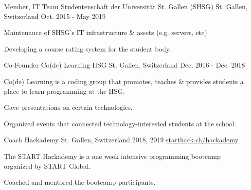 

\begin{cventries}

  \cventry
    {Member, IT Team} %
    {Studentenschaft der Universität St. Gallen (SHSG)} %
    {St. Gallen, Switzerland} %
    {Oct. 2015 - May 2019} %
    {} %
    {
      \begin{cvitems} %
        \item {Maintenance of SHSG's IT infrastructure \& assets (e.g. servers, etc)}
        \item {Developing a course rating system for the student body.}
      \end{cvitems}
    }
  \cventry
    {Co-Founder} %
    {Co(de) Learning HSG} %
    {St. Gallen, Switzerland} %
    {Dec. 2016 - Dec. 2018} %
    {} %
    {
      \begin{cvitems} %
        \item {Co(de) Learning is a coding group that promotes, teaches \& provides students a place to learn programming at the HSG.}
        \item {Gave presentations on certain technologies.}
        \item {Organized events that connected technology-interested students at the school.}
      \end{cvitems}
    }

    \cventry
      {Coach} %
      {Hackademy} %
      {St. Gallen, Switzerland} %
      {2018, 2019} %
      {\href{https://starthack.ch/hackademy/}{starthack.ch/hackademy}} %
      {
        \begin{cvitems} %
          \item {The START Hackademy is a one week intensive programming bootcamp organized by START Global.}
          \item {Coached and mentored the bootcamp participants.}
        \end{cvitems}
      }




\end{cventries}
